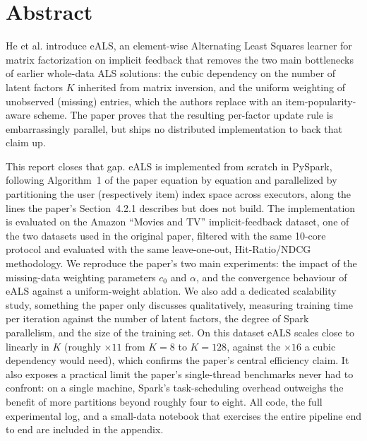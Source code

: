 \chapter*{\centering \Large Abstract}

\noindent
He et al. \citep{he2016eals} introduce eALS, an element-wise Alternating
Least Squares learner for matrix factorization on implicit feedback that
removes the two main bottlenecks of earlier whole-data ALS solutions: the
cubic dependency on the number of latent factors $K$ inherited from matrix
inversion, and the uniform weighting of unobserved (missing) entries, which
the authors replace with an item-popularity-aware scheme. The paper proves
that the resulting per-factor update rule is embarrassingly parallel, but
ships no distributed implementation to back that claim up.

\medskip
This report closes that gap. eALS is implemented from scratch in PySpark,
following Algorithm~1 of the paper equation by equation and parallelized by
partitioning the user (respectively item) index space across executors,
along the lines the paper's Section~4.2.1 describes but does not build. The
implementation is evaluated on the Amazon ``Movies and TV'' implicit-feedback
dataset, one of the two datasets used in the original paper, filtered with
the same 10-core protocol and evaluated with the same leave-one-out,
Hit-Ratio/NDCG methodology. We reproduce the paper's two main experiments:
the impact of the missing-data weighting parameters $c_0$ and $\alpha$, and
the convergence behaviour of eALS against a uniform-weight ablation. We also
add a dedicated scalability study, something the paper only discusses
qualitatively, measuring training time per iteration against the number of
latent factors, the degree of Spark parallelism, and the size of the
training set. On this dataset eALS scales close to linearly in $K$ (roughly
$\times 11$ from $K{=}8$ to $K{=}128$, against the $\times 16$ a cubic
dependency would need), which confirms the paper's central efficiency
claim. It also exposes a practical limit the paper's single-thread
benchmarks never had to confront: on a single machine, Spark's
task-scheduling overhead outweighs the benefit of more partitions beyond
roughly four to eight. All code, the full experimental log, and a
small-data notebook that exercises the entire pipeline end to end are
included in the appendix.
